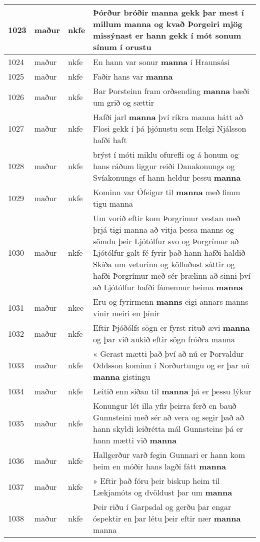 \documentclass{article}
\begin{document}
\begin{longtable}{p{1cm}|p{1cm}|p{1cm}|p{13cm}}
\hline
1023&maður&nkfe&Þórður bróðir \textbf{manna} gekk þar mest í millum manna og kvað Þorgeiri mjög missýnast er hann gekk í mót sonum sínum í orustu\\
\hline
1024&maður&nkfe&En hann var sonur \textbf{manna} í Hraunsási\\
\hline
1025&maður&nkfe&Faðir hans var \textbf{manna} \\
\hline
1026&maður&nkfe&Bar Þorsteinn fram orðsending \textbf{manna} bæði um grið og sættir\\
\hline
1027&maður&nkfe&Hafði jarl \textbf{manna} því ríkra manna hátt að Flosi gekk í þá þjónustu sem Helgi Njálsson hafði haft\\
\hline
1028&maður&nkfe&brýst í móti miklu ofurefli og á honum og hans ráðum liggur reiði Danakonungs og Svíakonungs ef hann heldur þessu \textbf{manna} \\
\hline
1029&maður&nkfe&Kominn var Ófeigur til \textbf{manna} með fimm tigu manna\\
\hline
1030&maður&nkfe&Um vorið eftir kom Þorgrímur vestan með þrjá tigi manna að vitja þessa manns og sömdu þeir Ljótólfur svo og Þorgrímur að Ljótólfur galt fé fyrir það hann hafði haldið Skíða um veturinn og kölluðust sáttir og hafði Þorgrímur með sér þrælinn að sinni því að Ljótólfur hafði fámennur heima \textbf{manna} \\
\hline
1031&maður&nkee&Eru og fyrirmenn \textbf{manns} eigi annars manns vinir meiri en þínir\\
\hline
1032&maður&nkfe&Eftir Þjóðólfs sögn er fyrst rituð ævi \textbf{manna} og þar við aukið eftir sögn fróðra manna\\
\hline
1033&maður&nkfe&« Gerast mætti það því að nú er Þorvaldur Oddsson kominn í Norðurtungu og er þar nú \textbf{manna} gistingu\\
\hline
1034&maður&nkfe&Leitið enn síðan til \textbf{manna} þá er þessu lýkur\\
\hline
1035&maður&nkfe&Konungur lét illa yfir þeirra ferð en bauð Gunnsteini með sér að vera og segir það að hann skyldi leiðrétta mál Gunnsteins þá er hann mætti við \textbf{manna} \\
\hline
1036&maður&nkfe&Hallgerður varð fegin Gunnari er hann kom heim en móðir hans lagði fátt \textbf{manna} \\
\hline
1037&maður&nkfe&» Eftir það fóru þeir biskup heim til Lækjamóts og dvöldust þar um \textbf{manna} \\
\hline
1038&maður&nkfe&Þeir riðu í Garpsdal og gerðu þar engar óspektir en þar létu þeir eftir nær \textbf{manna} manna\\

\end{longtable}
\end{document}
